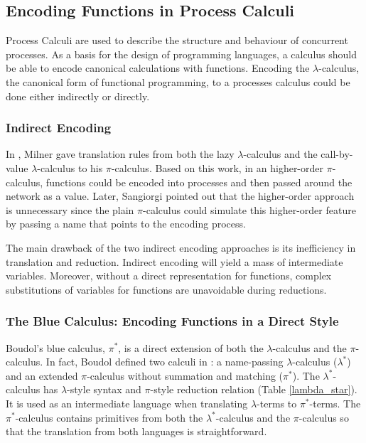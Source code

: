 \subsection{Encoding Functions in Process Calculi}
\label{sec:blue}
Process Calculi are used to describe the structure and behaviour of concurrent processes.  As a basis for the design of programming languages, a calculus should be able to encode canonical calculations with functions.  Encoding the $\lambda$-calculus, the canonical form of functional programming, to a processes calculus could be done either indirectly or directly.  

\subsubsection{Indirect Encoding}
In \cite{function_as_process}, Milner gave translation rules from both the lazy $\lambda$-calculus and the call-by-value $\lambda$-calculus to his $\pi$-calculus.  Based on this work, in an higher-order $\pi$-calculus, functions could be encoded into processes and then passed around the network as a value.  Later, Sangiorgi pointed out that the higher-order approach is unnecessary since the plain $\pi$-calculus could simulate this higher-order feature by passing a name that points to the encoding process\cite{HOPI}.

The main drawback of the two indirect encoding approaches is its inefficiency in translation and reduction.  Indirect encoding will yield a mass of intermediate variables.  Moreover, without a direct representation for functions, complex substitutions of variables for functions are unavoidable during reductions.

\subsubsection{The Blue Calculus: Encoding Functions in a Direct Style}
Boudol's blue calculus, $\pi^*$, is a direct extension of both the $\lambda$-calculus and the $\pi$-calculus.  In fact, Boudol defined two calculi in \cite{Blue}: a name-passing $\lambda$-calculus ($\lambda^*$) and an extended $\pi$-calculus without summation and matching ($\pi^*$).  The $\lambda^*$-calculus has $\lambda$-style syntax and $\pi$-style reduction relation (Table \ref{lambda_star}).  It is used as an intermediate language when translating $\lambda$-terms to $\pi^*$-terms.  The $\pi^*$-calculus contains primitives from both the $\lambda^*$-calculus and the $\pi$-calculus so that the translation from both languages is straightforward.

